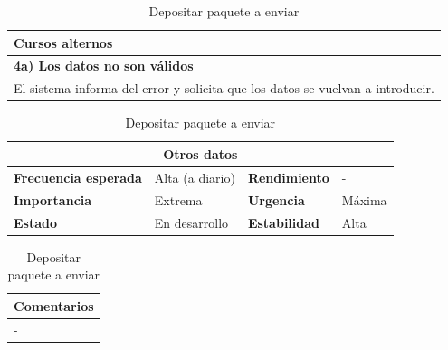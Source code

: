 \documentclass[12pt,spanish]{article}
\begin{document}
\begin{table}[H]
\vspace{1cm}

\begin{tabular}{|m{10pt}|m{7.15cm}|m{10pt}|m{7.15cm}|}
\hline
\multicolumn{4}{|m{16.2cm}|}{\textbf{Cursos alternos}} \\
\hline
\multicolumn{4}{|m{16.2cm}|}{\textbf{4a) Los datos no son válidos}} \\
\hline
\multicolumn{4}{|m{16.2cm}|}{El sistema informa del error y solicita que los datos se vuelvan a introducir.} \\
\hline
\end{tabular}

\vspace{1cm}

\begin{tabular}{|m{3.72cm}|m{3.72cm}|m{3.72cm}|m{3.72cm}|}
\hline
\multicolumn{4}{|c|}{\textbf{Otros datos}} \\
\hline
\textbf{Frecuencia esperada} & Alta (a diario) & \textbf{Rendimiento} & - \\
\hline
\textbf{Importancia} & Extrema & \textbf{Urgencia} & Máxima \\
\hline
\textbf{Estado} & En desarrollo & \textbf{Estabilidad} & Alta \\
\hline
\end{tabular}

\vspace{1cm}

\begin{tabular}{|m{16.2cm}|}
\hline
\textbf{Comentarios} \\
\hline
- \\
\hline
\end{tabular}

\caption{Depositar paquete a enviar}

\end{table}

\end{document}
